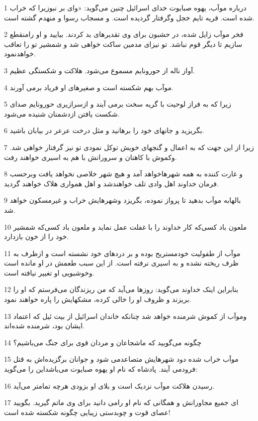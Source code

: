\par 1 درباره موآب، یهوه صبایوت خدای اسرائیل چنین می‌گوید: «وای بر نبوزیرا که خراب شده است. قریه تایم خجل وگرفتار گردیده است. و مسجاب رسوا و منهدم گشته است.
\par 2 فخر موآب زایل شده، در حشبون برای وی تقدیرهای بد کردند. بیایید و او رامنقطع سازیم تا دیگر قوم نباشد. تو نیز‌ای مدمین ساکت خواهی شد و شمشیر تو را تعاقب خواهدنمود.
\par 3 آواز ناله از حورونایم مسموع می‌شود. هلاکت و شکستگی عظیم.
\par 4 موآب بهم شکسته است و صغیرهای او فریاد برمی آورند.
\par 5 زیرا که به فراز لوحیت با گریه سخت برمی آیند و ازسرازیری حورونایم صدای شکست یافتن ازدشمنان شنیده می‌شود.
\par 6 بگریزید و جانهای خود را برهانید و مثل درخت عرعر در بیابان باشید.
\par 7 زیرا از این جهت که به اعمال و گنجهای خویش توکل نمودی تو نیز گرفتار خواهی شد. وکموش با کاهنان و سرورانش با هم به اسیری خواهند رفت.
\par 8 و غارت کننده به همه شهرهاخواهد آمد و هیچ شهر خلاصی نخواهد یافت وبرحسب فرمان خداوند اهل وادی تلف خواهندشد و اهل همواری هلاک خواهند گردید.
\par 9 بالهابه موآب بدهید تا پرواز نموده، بگریزد وشهرهایش خراب و غیرمسکون خواهد شد.
\par 10 ملعون باد کسی‌که کار خداوند را با غفلت عمل نماید و ملعون باد کسی‌که شمشیر خود را از خون باز‌دارد.
\par 11 موآب از طفولیت خودمستریح بوده و بر دردهای خود نشسته است و ازظرف به ظرف ریخته نشده و به اسیری نرفته است. از این سبب طعمش در او مانده است وخوشبویی او تغییر نیافته است.
\par 12 بنابراین اینک خداوند می‌گوید: روزها می‌آید که من ریزندگان می‌فرستم که او را بریزند و ظروف او را خالی کرده، مشکهایش را پاره خواهند نمود.
\par 13 وموآب از کموش شرمنده خواهد شد چنانکه خاندان اسرائیل از بیت ئیل که اعتماد ایشان بود، شرمنده شده‌اند.
\par 14 چگونه می‌گویید که ماشجاعان و مردان قوی برای جنگ می‌باشیم؟
\par 15 موآب خراب شده دود شهرهایش متصاعدمی شود و جوانان برگزیده‌اش به قتل فرودمی آیند. پادشاه که نام او یهوه صبایوت می‌باشداین را می‌گوید:
\par 16 رسیدن هلاکت موآب نزدیک است و بلای او بزودی هر‌چه تمامتر می‌آید.
\par 17 ‌ای جمیع مجاورانش و همگانی که نام او رامی دانید برای وی ماتم گیرید. بگویید عصای قوت و چوبدستی زیبایی چگونه شکسته شده است!
